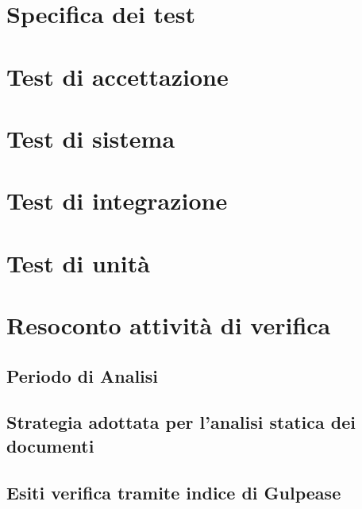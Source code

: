 \section{Specifica dei test}
\section{Test di accettazione}
\section{Test di sistema}
\section{Test di integrazione}
\section{Test di unità}
\section{Resoconto attività di verifica}
\subsection{Periodo di Analisi}
\subsection{Strategia adottata per l'analisi statica dei documenti}
\subsection{Esiti verifica tramite indice di Gulpease}


